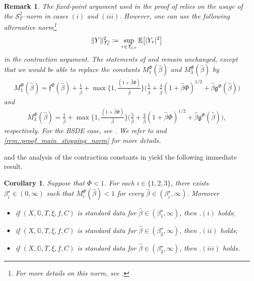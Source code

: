 \documentclass[10pt]{article} %
\newtheorem{corollary}[theorem]{Corollary}
\newtheorem{remark}[theorem]{Remark}
\newcommand\cS{\mathcal S}
\newcommand\cT{\mathcal T}
\newcommand{\smalltext}[1]{\text{\fontsize{4}{4}\selectfont$#1$}}
\newcommand\ff{\mathfrak f}
\newcommand\fg{\mathfrak g}
\def \E{\mathbb{E}}
\def \G{\mathbb{G}}
\newcommand{\1}{\mathbf{1}}
\begin{document}
\begin{remark}\label{rem::reflection_stopping_norm}
	The fixed-point argument used in the proof of {\rm{}} relies on the usage of the $\cS^2_T$--norm in cases $(i)$ and $(iii)$. However, one can use the following alternative norm\footnote{For more details on this norm, see \cite[IV.21, pp. 82--83]{dellacherie1982probabilities}.}
	\begin{equation}\label{eq::def_norm_tau}
		\|Y\|^2_{\cT^\smalltext{2}_\smalltext{T}} \coloneqq \sup_{\tau \in \cT_{\smalltext{0}\smalltext{,}\smalltext{T}}}\E\big[|Y_\tau|^2\big]
	\end{equation}
	in the contraction argument.
	The statements of {\rm{}} and {\rm{}} remain unchanged, except that we would be able to replace the constants $M_1^\Phi(\hat\beta)$ and $M_3^\Phi (\hat\beta)$ by
	\begin{align*}
	M_1^\Phi(\hat\beta) = \ff^\Phi(\hat\beta) + \frac{1}{\hat\beta} + \max\bigg\{1,\frac{(1+\hat\beta\Phi)}{\hat\beta}\bigg\}\bigg(\frac{5}{\hat\beta} +\frac{4}{\hat\beta}(1+\hat\beta\Phi)^{1/2} + \hat\beta \fg^\Phi(\hat\beta)\bigg)
	\end{align*}
	and
	\begin{align*}
	M_3^\Phi (\hat\beta) = \frac{1}{\hat\beta} + \max\bigg\{1,\frac{(1+\hat\beta\Phi)}{\hat\beta}\bigg\}\bigg(\frac{5}{\hat\beta} +\frac{4}{\hat\beta}(1+\hat\beta\Phi)^{1/2} + \hat\beta \fg^\Phi(\hat\beta)\bigg),
\end{align*}
	respectively. For the {\rm BSDE} case, see {\rm{}}. We refer to {\rm{}} and {\rm\ref{rem::proof_main_stopping_norm}} for more details.
\end{remark}

 and the analysis of the contraction constants in  yield the following immediate result.

\begin{corollary}\label{cor::main_result_reflected_bsde}
	Suppose that $\Phi < 1$. For each $i \in \{1,2,3\}$, there exists $\beta^\star_i \in (0,\infty)$ such that $M^\Phi_i(\hat\beta) <1$ for every $\hat\beta \in (\beta^\star_i,\infty)$. Moreover
	\begin{itemize}
		\item[$(i)$] if $(X,\G,T,\xi,f,C)$ is standard data for $\hat\beta \in (\beta^\star_1,\infty)$, then {\rm{}.$(i)$} holds$;$
		\item[$(ii)$] if $(X,\G,T,\xi,f,C)$ is standard data for $\hat\beta \in (\beta^\star_2,\infty)$, then {\rm{}.$(ii)$} holds$;$
		\item[$(iii)$] if $(X,\G,T,\xi,f,C)$ is standard data for $\hat\beta \in (\beta^\star_3,\infty)$, then {\rm{}.$(iii)$} holds.
	\end{itemize}
\end{corollary}
\end{document}
